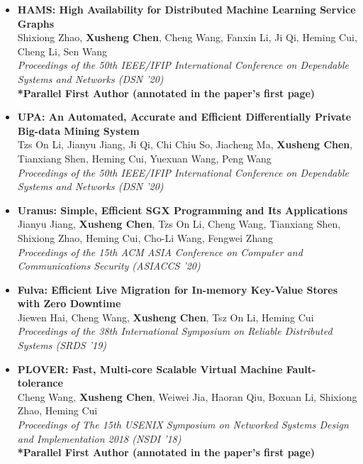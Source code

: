 \documentclass[a4paper,8pt]{article} %
\begin{document}
\begin{itemize}
    \item \textbf{HAMS: High Availability for Distributed Machine Learning Service Graphs} \\ 
    Shixiong Zhao, \textbf{Xusheng Chen}, Cheng Wang, Fanxin Li, Ji Qi, Heming Cui, Cheng Li, Sen Wang \\
    \textit{Proceedings of the 50th IEEE/IFIP International Conference on Dependable Systems and Networks (DSN '20)}\\
    \textbf{*Parallel First Author (annotated in the paper's first page)}\\

    \item \textbf{UPA: An Automated, Accurate and Efficient Differentially Private Big-data Mining System} \\ 
    Tzs On Li, Jianyu Jiang, Ji Qi, Chi Chiu So, Jiacheng Ma, \textbf{Xusheng Chen}, Tianxiang Shen, Heming Cui, Yuexuan Wang, Peng Wang \\
    \textit{Proceedings of the 50th IEEE/IFIP International Conference on Dependable Systems and Networks (DSN '20)}\\ 

    \item \textbf{Uranus: Simple, Efficient SGX Programming and Its Applications} \\
    Jianyu Jiang, \textbf{Xusheng Chen}, Tzs On Li, Cheng Wang, Tianxiang Shen, Shixiong Zhao, Heming Cui, Cho-Li Wang, Fengwei Zhang \\
    \textit{Proceedings of the 15th ACM ASIA Conference on Computer and Communications Security (ASIACCS '20)} \\

    \item \textbf{Fulva: Efficient Live Migration for In-memory Key-Value Stores with Zero Downtime} \\
    Jiewen Hai, Cheng Wang, \textbf{Xusheng Chen}, Tsz On Li, Heming Cui \\ 
    \textit{Proceedings of the 38th International Symposium on Reliable Distributed Systems (SRDS '19)} \\


    \item \textbf{PLOVER: Fast, Multi-core Scalable Virtual Machine Fault-tolerance}\\
    Cheng Wang, \textbf{Xusheng Chen}, Weiwei Jia, Haoran Qiu, Boxuan Li, Shixiong Zhao, Heming Cui\\
    \textit{Proceedings of The 15th USENIX Symposium on Networked Systems Design and Implementation 2018 (NSDI '18)}\\
    \textbf{*Parallel First Author (annotated in the paper's first page)}\\


\end{itemize}
\end{document}
